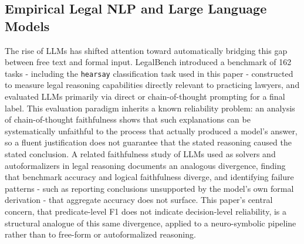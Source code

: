 \subsection{Empirical Legal NLP and Large Language Models}
\label{subsec:related-llm}
The rise of LLMs has shifted attention toward automatically bridging this gap between free text and formal input. LegalBench \cite{guha2023legalbench} introduced a benchmark of 162 tasks - including the \texttt{hearsay} classification task used in this paper - constructed to measure legal reasoning capabilities directly relevant to practicing lawyers, and evaluated LLMs primarily via direct or chain-of-thought prompting for a final label. This evaluation paradigm inherits a known reliability problem: an analysis of chain-of-thought faithfulness \cite{turpin2023unfaithful} shows that such explanations can be systematically unfaithful to the process that actually produced a model's answer, so a fluent justification does not guarantee that the stated reasoning caused the stated conclusion. A related faithfulness study of LLMs used as solvers and autoformalizers in legal reasoning \cite{wang2026knowyourlimits} documents an analogous divergence, finding that benchmark accuracy and logical faithfulness diverge, and identifying failure patterns - such as reporting conclusions unsupported by the model's own formal derivation - that aggregate accuracy does not surface. This paper's central concern, that predicate-level F1 does not indicate decision-level reliability, is a structural analogue of this same divergence, applied to a neuro-symbolic pipeline rather than to free-form or autoformalized reasoning.

